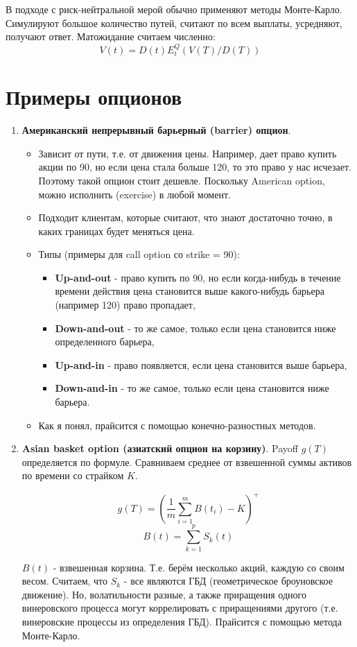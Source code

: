 \documentclass{article}
\begin{document}
В подходе с риск-нейтральной мерой обычно применяют методы Монте-Карло. Симулируют большое количество путей, считают по всем выплаты, усредняют, получают ответ. Матожидание считаем численно:
\[V(t) = D(t) E_t^Q (V(T)/D(T))\]

\section{Примеры опционов}

\begin{enumerate}
  \item \textbf{Американский непрерывный барьерный (barrier) опцион}. 
  \begin{itemize}
  \item Зависит от пути, т.е. от движения цены. Например, дает право купить акции по 90, но если цена стала больше 120, то  это право у нас исчезает. Поэтому такой опцион стоит дешевле. Поскольку American option, можно исполнить (exercise) в любой момент. 
  \item Подходит клиентам, которые считают, что знают достаточно точно, в каких границах будет меняться цена. 
  \item Типы (примеры для call option со strike = 90): 
      \begin{itemize}
      \item \textbf{Up-and-out} - право купить по 90, но если когда-нибудь в течение времени действия цена становится выше какого-нибудь барьера (например 120) право пропадает, 
      \item \textbf{Down-and-out} - то же самое, только если цена становится ниже определенного барьера, 
      \item \textbf{Up-and-in} - право появляется, если цена становится выше барьера, 
      \item  \textbf{Down-and-in} - то же самое, только если цена становится ниже барьера.  
      \end{itemize}
        \item Как я понял, прайсится с помощью конечно-разностных методов.
  \end{itemize}
  \item \textbf{Asian basket option (азиатский опцион на корзину)}. Payoff \(g(T)\) определяется по формуле. Сравниваем среднее от взвешенной суммы активов по времени со страйком \(K\).
  
  \[g(T) = (\frac{1}{m} \sum_{i=1}^m B(t_i) - K)^{+}\]
  \[B(t) = \sum_{k=1}^p S_k(t)\]
  
  \(B(t)\) - взвешенная корзина. Т.е. берём несколько акций, каждую со своим весом. Считаем, что \(S_k\) - все являются ГБД (геометрическое броуновское движение). Но, волатильности разные, а также приращения одного винеровского процесса могут коррелировать с приращениями другого (т.е. винеровские процессы из определения ГБД). Прайсится с помощью метода Монте-Карло.
\end{enumerate}
\end{document}

